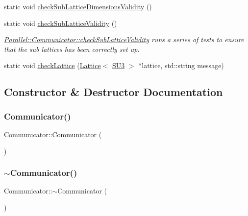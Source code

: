 \begin{DoxyCompactItemize}
static void \mbox{\hyperlink{class_parallel_1_1_communicator_a535fddf3fe091b82f8ca3de7974f7412}{check\+Sub\+Lattice\+Dimensions\+Validity}} ()
\item 
static void \mbox{\hyperlink{class_parallel_1_1_communicator_a5da7239eefebcebbeeabee499b2d724d}{check\+Sub\+Lattice\+Validity}} ()
\begin{DoxyCompactList}\small\item\em \mbox{\hyperlink{class_parallel_1_1_communicator_a5da7239eefebcebbeeabee499b2d724d}{Parallel\+::\+Communicator\+::check\+Sub\+Lattice\+Validity}} runs a series of tests to ensure that the sub lattices has been correctly set up. \end{DoxyCompactList}\item 
static void \mbox{\hyperlink{class_parallel_1_1_communicator_a9471bf9448f34a0b4575310a3c54af61}{check\+Lattice}} (\mbox{\hyperlink{class_lattice}{Lattice}}$<$ \mbox{\hyperlink{class_s_u3}{S\+U3}} $>$ $\ast$lattice, std\+::string message)
\end{DoxyCompactItemize}


\subsection{Constructor \& Destructor Documentation}
\mbox{\label{class_parallel_1_1_communicator_abd4c26c6a901e571bc9cfc4259e65de3}} 
\subsubsection{\texorpdfstring{Communicator()}{Communicator()}}
{\footnotesize\ttfamily Communicator\+::\+Communicator (\begin{DoxyParamCaption}{ }\end{DoxyParamCaption})}

\mbox{\label{class_parallel_1_1_communicator_a4ced5362bf7438924f8d7f1b0c5ec391}} 
\subsubsection{\texorpdfstring{$\sim$Communicator()}{~Communicator()}}
{\footnotesize\ttfamily Communicator\+::$\sim$\+Communicator (\begin{DoxyParamCaption}{ }\end{DoxyParamCaption})}



